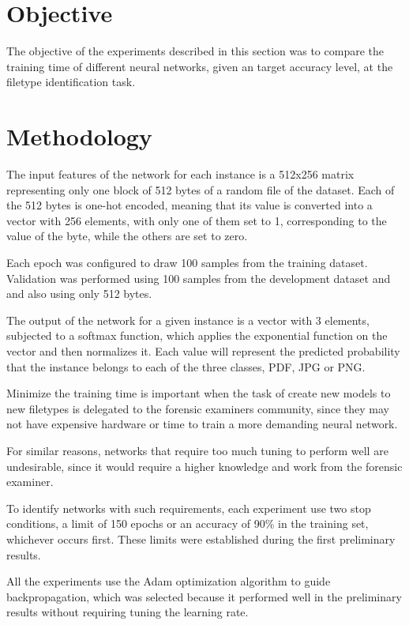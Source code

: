 \section{Objective}
The objective of the experiments described in this section 
was to compare the training time of different neural networks, given an target accuracy level, at the filetype identification task.

\section{Methodology}

The input features of the network for each instance is a 512x256 matrix representing only one block of 512 bytes of a random file of the dataset. Each of the 512 bytes is one-hot encoded, meaning that its value is converted into a vector with 256 elements, with only one of them set to 1, corresponding to the value of the byte, while the others are set to zero.

Each epoch was configured to draw 100 samples from the training dataset. Validation was performed using 100 samples from the development dataset and and also using only 512 bytes.

The output of the network for a given instance is a vector with 3 elements, subjected to a softmax function, which applies the exponential function on the vector and then normalizes it. Each value will represent the predicted probability that the instance belongs to each of the three classes, PDF, JPG or PNG.

Minimize the training time is important when the task of create new models to new filetypes is delegated to the forensic examiners community, since they may not have expensive hardware or time to train a more demanding neural network.

For similar reasons, networks that require too much tuning to perform well are undesirable, since it would require a higher knowledge and work from the forensic examiner.


To identify networks with such requirements, each experiment use two stop conditions, a limit of 150 epochs or an accuracy of 90\% in the training set, whichever occurs first. These limits were established during the first preliminary results.

All the experiments use the Adam
optimization algorithm to guide backpropagation, which was selected because it performed well in the preliminary results without requiring tuning the learning rate.

